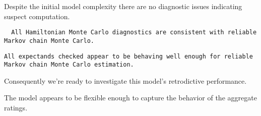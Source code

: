 \documentclass[
  letterpaper,
  DIV=11,
  numbers=noendperiod]{scrartcl}
\newenvironment{Shaded}{\begin{snugshade}}{\end{snugshade}}
\newcommand{\AttributeTok}[1]{\textcolor[rgb]{0.40,0.45,0.13}{#1}}
\newcommand{\ConstantTok}[1]{\textcolor[rgb]{0.56,0.35,0.01}{#1}}
\newcommand{\FunctionTok}[1]{\textcolor[rgb]{0.28,0.35,0.67}{#1}}
\newcommand{\NormalTok}[1]{\textcolor[rgb]{0.00,0.23,0.31}{#1}}
\newcommand{\OtherTok}[1]{\textcolor[rgb]{0.00,0.23,0.31}{#1}}
\newcommand{\SpecialCharTok}[1]{\textcolor[rgb]{0.37,0.37,0.37}{#1}}
\newcommand{\StringTok}[1]{\textcolor[rgb]{0.13,0.47,0.30}{#1}}
\begin{document}
Despite the initial model complexity there are no diagnostic issues
indicating suspect computation.

\begin{Shaded}
\end{Shaded}

\begin{verbatim}
  All Hamiltonian Monte Carlo diagnostics are consistent with reliable
Markov chain Monte Carlo.
\end{verbatim}

\begin{Shaded}
\end{Shaded}

\begin{verbatim}
All expectands checked appear to be behaving well enough for reliable
Markov chain Monte Carlo estimation.
\end{verbatim}

Consequently we're ready to investigate this model's retrodictive
performance.

The model appears to be flexible enough to capture the behavior of the
aggregate ratings.
\end{document}
